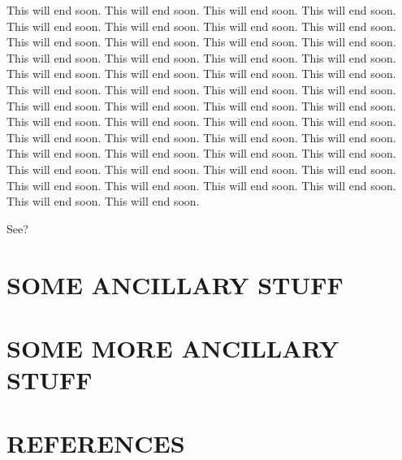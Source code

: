 \documentclass[12pt,econ]{sources/authesis}
\begin{document}
This will end soon. This will end soon. This will end soon. This will
end soon. This will end soon. This will end soon. This will end soon.
This will end soon. This will end soon. This will end soon. This will
end soon. This will end soon. This will end soon. This will end soon.
This will end soon. This will end soon. This will end soon. This will
end soon. This will end soon. This will end soon. This will end soon.
This will end soon. This will end soon. This will end soon. This will
end soon. This will end soon. This will end soon. This will end soon.
This will end soon. This will end soon. This will end soon. This will
end soon. This will end soon. This will end soon. This will end soon.
This will end soon. This will end soon. This will end soon. This will
end soon. This will end soon. This will end soon. This will end soon.
This will end soon. This will end soon. This will end soon. This will
end soon. This will end soon. This will end soon. This will end soon.
This will end soon.

See?

\appendix

\chapter{SOME ANCILLARY STUFF}\label{some-ancillary-stuff}

\chapter{SOME MORE ANCILLARY STUFF}\label{some-more-ancillary-stuff}

\chapter*{REFERENCES}\label{references}

\noindent

\ssp
\end{document}
